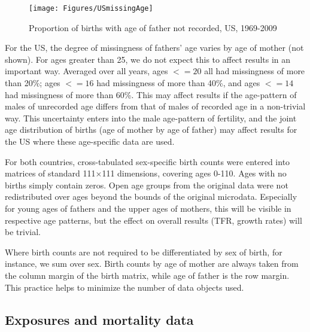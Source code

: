\begin{figure}[ht!]
        \centering  
          \caption{Proportion of births with age of father not recorded, US,
          1969-2009}
           \texttt{[image: Figures/USmissingAge]}
          \label{fig:USmissingAge}
\end{figure}

For the US, the degree of missingness of fathers' age varies by age of
mother (not shown). For ages greater than 25, we do not expect this to affect
results in an important way. Averaged over all years, ages $<= 20$ all had missingness of more than
20\%; ages $<= 16$ had missingness of more than 40\%, and ages $<= 14$ had
missingness of more than 60\%. This may affect results if the age-pattern of
males of unrecorded age differs from that of males of recorded age in a
non-trivial way. This uncertainty enters into the male
age-pattern of fertility, and the joint
age distribution of births (age of mother by age of father) may affect results
for the US where these age-specific data are used.

For both countries, cross-tabulated
sex-specific birth counts were entered into matrices of standard 111$\times$111
dimensions, covering ages 0-110. Ages with no births simply contain zeros. Open
age groups from the original data were not redistributed over ages beyond the
bounds of the original microdata. Especially for young ages of fathers and the
upper ages of mothers, this will be visible in respective age
patterns, but the effect on overall results (TFR, growth rates) will be
trivial.

Where birth counts are not required to be differentiated by sex of birth, for
instance, we sum over sex. Birth counts by age of mother are always taken from
the column margin of the birth matrix, while age of father is the row margin.
This practice helps to minimize the number of data objects used.

\subsection{Exposures and mortality data}

